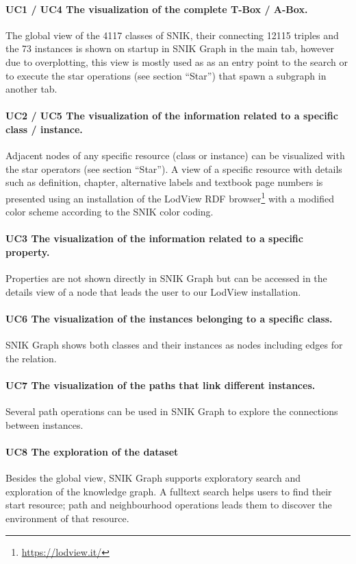 \documentclass[conference]{IEEEtran}
\begin{document}
\paragraph{UC1 / UC4 The visualization of the complete T-Box / A-Box.}
The global view of the 4117 classes of SNIK, their connecting 12115 triples and the 73 instances is shown on startup in SNIK Graph in the main tab, however due to overplotting, this view is mostly used as as an entry point to the search or to execute the star operations (see section \enquote{Star}) that spawn a subgraph in another tab.

\paragraph{UC2 / UC5 The visualization of the information related to a specific class / instance.}
Adjacent nodes of any specific resource (class or instance) can be visualized with the star operators (see section \enquote{Star}).
A view of a specific resource with details such as definition, chapter, alternative labels and textbook page numbers is presented using an installation of the LodView RDF browser\footnote{\url{https://lodview.it/}} with a modified color scheme according to the SNIK color coding.

\paragraph{UC3 The visualization of the information related to a specific property.}
Properties are not shown directly in SNIK Graph but can be accessed in the details view of a node that leads the user to our LodView installation.

\paragraph{UC6 The visualization of the instances belonging to a specific class.}
SNIK Graph shows both classes and their instances as nodes including edges for the  relation.

\paragraph{UC7 The visualization of the paths that link different instances.}
Several path operations can be used in SNIK Graph to explore the connections between instances.

\paragraph{UC8 The exploration of the dataset}
Besides the global view, SNIK Graph supports exploratory search and exploration of the knowledge graph.
A fulltext search helps users to find their start resource; path and neighbourhood operations leads them to discover the environment of that resource.
\end{document}
